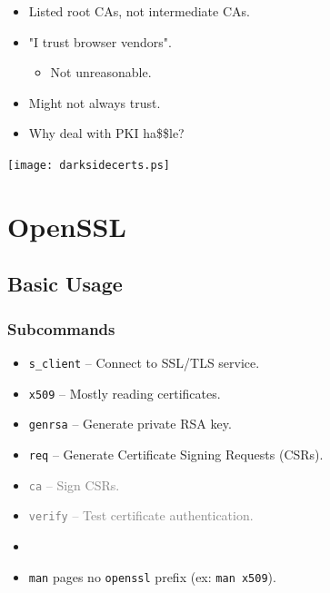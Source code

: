 \documentclass[xcolor={dvipsnames,svgnames},hyperref=dvips]{beamer}
\begin{document}
	\begin{frame}
		\begin{itemize}
		\item Listed root CAs, not intermediate CAs.
		\item "I trust browser vendors".
		\begin{itemize}
			\item Not unreasonable.
		\end{itemize}
		\item Might not always trust.
		\item Why deal with PKI ha\$\$le?
		\end{itemize}
	\end{frame}

	\begin{frame}
		\center\texttt{[image: darksidecerts.ps]}
	\end{frame}

\section{OpenSSL}
\subsection{Basic Usage}
	\begin{frame}
		\frametitle{Subcommands}
		\begin{itemize}
			\item \texttt{s\_client} -- Connect to SSL/TLS service.
			\item \texttt{x509} -- Mostly reading certificates.
			\item \texttt{genrsa} -- Generate private RSA key.
			\item \texttt{req} -- Generate Certificate Signing Requests (CSRs).
			\item \textcolor{gray}{\texttt{ca} -- Sign CSRs.}
			\item \textcolor{gray}{\texttt{verify} -- Test certificate authentication.}
			\item[]
			\item \texttt{man} pages no \texttt{openssl} prefix (ex: \texttt{man x509}).
		\end{itemize}
	\end{frame}
\end{document}
